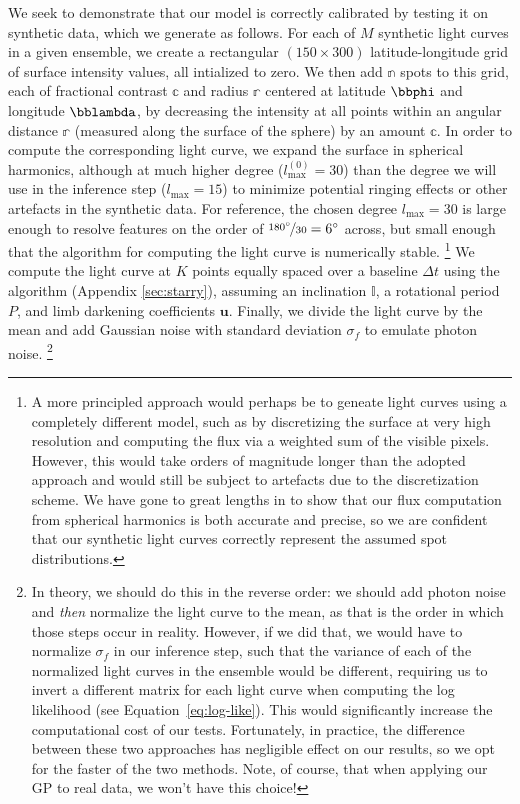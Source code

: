 \documentclass[modern,linenumbers]{aastex62}
\begin{document}
We seek to demonstrate that our model is correctly calibrated by testing it
on synthetic data, which we generate as follows. For each of $M$ synthetic
light curves in a given ensemble,
we create a rectangular
$(150 \times 300)$ latitude-longitude grid of surface intensity values, all
intialized
to zero. We then add $\mathbb{n}$ spots to this grid, each of fractional contrast
$\mathbb{c}$ and radius $\mathbb{r}$ centered at latitude $\bbphi$ and longitude $\bblambda$,
by decreasing the intensity at all points within an angular distance $\mathbb{r}$
(measured along the surface of the sphere) by an amount $\mathbb{c}$.
In order to compute the corresponding light curve, we expand the surface
in spherical harmonics, although at much higher degree
($l_\mathrm{max}^{(0)} = 30$)
than the degree we will use in the inference step ($l_\mathrm{max} = 15$)
to minimize potential ringing effects or other artefacts in the synthetic
data. For reference, the chosen degree $l_\mathrm{max} = 30$ is large
enough to resolve features on the order of
$\nicefrac{180^\circ}{30} = 6^\circ$ across, but small enough that
the algorithm for computing the light curve is numerically stable.%
\footnote{%
    A more principled approach would perhaps be to geneate light curves using
    a completely different model, such as by discretizing the surface at very
    high resolution and computing the flux via a weighted sum of the visible
    pixels. However, this would take orders of magnitude longer than the adopted
    approach and would still be subject to artefacts due to the discretization
    scheme. We have gone to great lengths in \citet{Luger2019} to show that
    our flux computation from spherical harmonics is both accurate and precise,
    so we are confident that our synthetic light curves correctly represent the
    assumed spot distributions.
}
We compute the light curve at $K$ points equally spaced over a baseline $\Delta t$
using the \starry algorithm
(Appendix \ref{sec:starry}), assuming an inclination $\mathbb{I}$, a rotational period $P$,
and limb darkening coefficients $\mathbf{u}$. Finally, we divide the
light curve by the mean and add Gaussian noise with standard deviation $\sigma_f$
to emulate photon noise.%
\footnote{
    In theory, we should do this in the reverse order: we should add photon
    noise and \emph{then} normalize the light curve to the mean, as that is the order in which
    those steps occur in reality. However, if we did that, we would have to normalize $\sigma_f$
    in our inference step, such that the variance of each of the normalized light curves
    in the ensemble would be different, requiring us to invert a different matrix for
    each light curve when computing the log likelihood (see Equation~\ref{eq:log-like}).
    This would significantly increase the computational cost of our tests. Fortunately, in
    practice, the difference between these two approaches has negligible effect on
    our results, so we opt for the faster of the two methods. Note, of course,
    that when applying our GP to real data, we won't have this choice!
}
\end{document}
